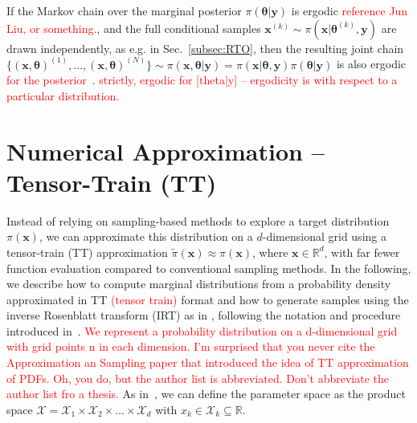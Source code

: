 If the Markov chain over the marginal posterior $\pi(\bm{\theta} |  \bm{y})$ is ergodic \textcolor{red}{reference Jun Liu, or something.}, and the full conditional samples $\bm{x}^{(k)} \sim \pi(\bm{x}|   \bm{\theta}^{(k)}, \bm{y})$ are drawn independently, as e.g. in Sec.~\ref{subsec:RTO}, then the resulting joint chain $\{ (\bm{x}, \bm{\theta})^{(1)}, \dots, (\bm{x}, \bm{\theta})^{(N)} \} \sim \pi(\bm{x}, \bm{\theta} |  \bm{y}) =  \pi(\bm{x} |  \bm{\theta} , \bm{y}) \pi( \bm{\theta} | \bm{y})$ is also ergodic \textcolor{red}{for the posterior}~\cite{acosta2022markov}. \textcolor{red}{strictly, ergodic for [theta|y] -- ergodicity is with respect to a particular distribution.}


\section{Numerical Approximation -- Tensor-Train (TT)}
\label{sec:tensortrain}
Instead of relying on sampling-based methods to explore a target distribution $\pi(\bm{x})$, we can approximate this distribution on a $d$-dimensional grid using a tensor-train (TT) approximation $\tilde{\pi}(\bm{x}) \approx \pi(\bm{x})$, where $\bm{x} \in \mathbb{R}^d$, with far fewer function evaluation compared to conventional sampling methods.
In the following, we describe how to compute marginal distributions from a probability density approximated in TT \textcolor{red}{ (tensor train)} format and how to generate samples using the inverse Rosenblatt transform (IRT) as in \cite{dolgov2020approximation}, following the notation and procedure introduced in~\cite{cui2022deep}.
\textcolor{red}{We represent a probability distribution on a d-dimensional grid with grid points n in each dimension.
I'm surprised that you never cite the Approximation an Sampling paper that introduced the idea of TT approximation of PDFs. Oh, you do, but the author list is abbreviated. Don't abbreviate the author list fro a thesis.}
As in~\cite{cui2022deep}, we can define the parameter space as the product space $\mathcal{X} = \mathcal{X}_1 \times \mathcal{X}_2 \times \dots \times \mathcal{X}_d$ with $ x_k \in \mathcal{X}_k \subseteq \mathbb{R}$.
